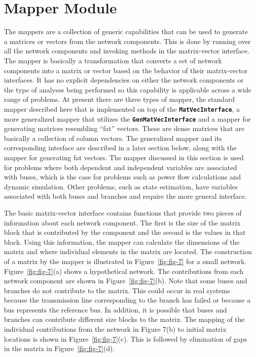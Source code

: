 \section{Mapper Module}

The mappers are a collection of generic capabilities that can be used to generate a matrices or vectors from the network components. This is done by running over all the network components and invoking methods in the matrix-vector interface. The mapper is basically a transformation that converts a set of network components into a matrix or vector based on the behavior of their matrix-vector interfaces. It has no explicit dependencies on either the network components or the type of analyses being performed so this capability is applicable across a wide range of problems. At present there are three types of mapper, the standard mapper described here that is implemented on top of the \texttt{\textbf{MatVecInterface}}, a more generalized mapper that utilizes the \texttt{\textbf{GenMatVecInterface}} and a mapper for generating matrices resembling ``fat'' vectors. These are dense matrices that are basically a collection of column vectors. The generalized mapper and its corresponding interface are described in a later section below, along with the mapper for generating fat vectors. The mapper discussed in this section is used for problems where both dependent and independent variables are associated with buses, which is the case for problems such as power flow calculations and dynamic simulation. Other problems, such as state estimation, have variables associated with both buses and branches and require the more general interface.

The basic matrix-vector interface contains functions that provide two pieces of information about each network component. The first is the size of the matrix block that is contributed by the component and the second is the values in that block. Using this information, the mapper can calculate the dimensions of the matrix and where individual elements in the matrix are located. The construction of a matrix by the mapper is illustrated in  Figure~\ref{fig:fig-7} for a small network. Figure~\ref{fig:fig-7}(a) shows a hypothetical network. The contributions from each network component are shown in  Figure~\ref{fig:fig-7}(b). Note that some buses and branches do not contribute to the matrix. This could occur in real systems because the transmission line corresponding to the branch has failed or because a bus represents the reference bus. In addition, it is possible that buses and branches can contribute different size blocks to the matrix. The mapping of the individual contributions from the network in Figure 7(b) to initial matrix locations is shown in  Figure~\ref{fig:fig-7}(c). This is followed by elimination of gaps in the matrix in Figure~\ref{fig:fig-7}(d).

